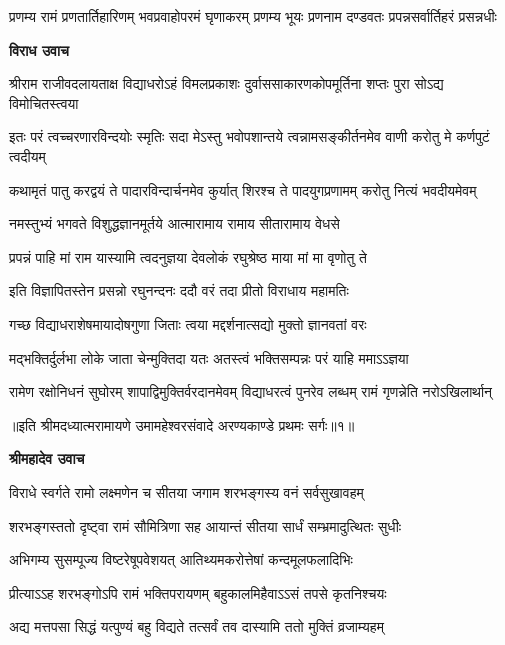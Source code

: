 \fourlineindentedshloka
{प्रणम्य रामं प्रणतार्तिहारिणम्}
{भवप्रवाहोपरमं घृणाकरम्}
{प्रणम्य भूयः प्रणनाम दण्डवतः}
{प्रपन्नसर्वार्तिहरं प्रसन्नधीः} %

\textbf{विराध उवाच}

\fourlineindentedshloka
{श्रीराम राजीवदलायताक्ष}
{विद्याधरोऽहं विमलप्रकाशः}
{दुर्वाससाकारणकोपमूर्तिना}
{शप्तः पुरा सोऽद्य विमोचितस्त्वया} %

\fourlineindentedshloka
{इतः परं त्वच्चरणारविन्दयोः}
{स्मृतिः सदा मेऽस्तु भवोपशान्तये}
{त्वन्नामसङ्कीर्तनमेव वाणी}
{करोतु मे कर्णपुटं त्वदीयम्} %

\fourlineindentedshloka
{कथामृतं पातु करद्वयं ते}
{पादारविन्दार्चनमेव कुर्यात्}
{शिरश्च ते पादयुगप्रणामम्}
{करोतु नित्यं भवदीयमेवम्} %

\twolineshloka
{नमस्तुभ्यं भगवते विशुद्धज्ञानमूर्तये}
{आत्मारामाय रामाय सीतारामाय वेधसे} %

\twolineshloka
{प्रपन्नं पाहि मां राम यास्यामि त्वदनुज्ञया}
{देवलोकं रघुश्रेष्ठ माया मां मा वृणोतु ते} %

\twolineshloka
{इति विज्ञापितस्तेन प्रसन्नो रघुनन्दनः}
{ददौ वरं तदा प्रीतो विराधाय महामतिः} %

\twolineshloka
{गच्छ विद्याधराशेषमायादोषगुणा जिताः}
{त्वया मद्दर्शनात्सद्यो मुक्तो ज्ञानवतां वरः} %

\twolineshloka
{मद्भक्तिर्दुर्लभा लोके जाता चेन्मुक्तिदा यतः}
{अतस्त्वं भक्तिसम्पन्नः परं याहि ममाऽऽज्ञया} %

\fourlineindentedshloka
{रामेण रक्षोनिधनं सुघोरम्}
{शापाद्विमुक्तिर्वरदानमेवम्}
{विद्याधरत्वं पुनरेव लब्धम्}
{रामं गृणन्नेति नरोऽखिलार्थान्} %

{॥इति श्रीमदध्यात्मरामायणे उमामहेश्वरसंवादे
अरण्यकाण्डे प्रथमः सर्गः॥१॥}




\textbf{श्रीमहादेव उवाच}

\twolineshloka
{विराधे स्वर्गते रामो लक्ष्मणेन च सीतया}
{जगाम शरभङ्गस्य वनं सर्वसुखावहम्} %

\twolineshloka
{शरभङ्गस्ततो दृष्ट्वा रामं सौमित्रिणा सह}
{आयान्तं सीतया सार्धं सम्भ्रमादुत्थितः सुधीः} %

\twolineshloka
{अभिगम्य सुसम्पूज्य विष्टरेषूपवेशयत्}
{आतिथ्यमकरोत्तेषां कन्दमूलफलादिभिः} %

\twolineshloka
{प्रीत्याऽऽह शरभङ्गोऽपि रामं भक्तिपरायणम्}
{बहुकालमिहैवाऽऽसं तपसे कृतनिश्चयः} %

\twolineshloka
{अद्य मत्तपसा सिद्धं यत्पुण्यं बहु विद्यते}
{तत्सर्वं तव दास्यामि ततो मुक्तिं व्रजाम्यहम्} %

